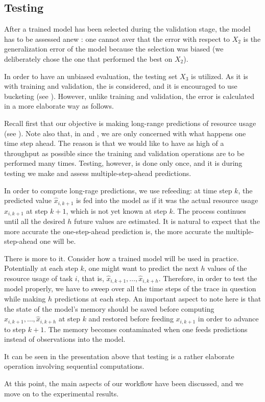 \subsection{Testing} 
After a trained model has been selected during the validation stage, the model
has to be assessed anew \cite{hastie2009}: one cannot aver that the error with
respect to $X_2$ is the generalization error of the model because the selection
was biased (we deliberately chose the one that performed the best on $X_2$).

In order to have an unbiased evaluation, the testing set $X_3$ is utilized. As
it is with training and validation, the  is considered, and it is
encouraged to use bucketing (see ). However, unlike training and
validation, the error is calculated in a more elaborate way as follows.

Recall first that our objective is making long-range predictions of resource
usage (see ). Note also that, in  and
, we are only concerned with what happens one time step ahead.
The reason is that we would like to have as high of a throughput as possible
since the training and validation operations are to be performed many times.
Testing, however, is done only once, and it is during testing we make and assess
multiple-step-ahead predictions.

In order to compute long-rage predictions, we use refeeding: at time step $k$,
the predicted value $\hat{x}_{i,k + 1}$ is fed into the model as if it was the
actual resource usage $x_{i,k + 1}$ at step $k + 1$, which is not yet known at
step $k$. The process continues until all the desired $h$ future values are
estimated. It is natural to expect that the more accurate the one-step-ahead
prediction is, the more accurate the multiple-step-ahead one will be.

There is more to it. Consider how a trained model will be used in practice.
Potentially at each step $k$, one might want to predict the next $h$ values of
the resource usage of task $i$, that is, $\hat{x}_{i,k + 1}, \dots, \hat{x}_{i,k
+ h}$. Therefore, in order to test the model properly, we have to sweep over all
the time steps of the trace in question while making $h$ predictions at each
step. An important aspect to note here is that the state of the model's memory
should be saved before computing $\hat{x}_{i,k + 1}, \dots, \hat{x}_{i,k + h}$
at step $k$ and restored before feeding $x_{i,k + 1}$ in order to advance to
step $k + 1$. The memory becomes contaminated when one feeds predictions instead
of observations into the model.

It can be seen in the presentation above that testing is a rather elaborate
operation involving sequential computations.

At this point, the main aspects of our workflow have been discussed, and we move
on to the experimental results.

